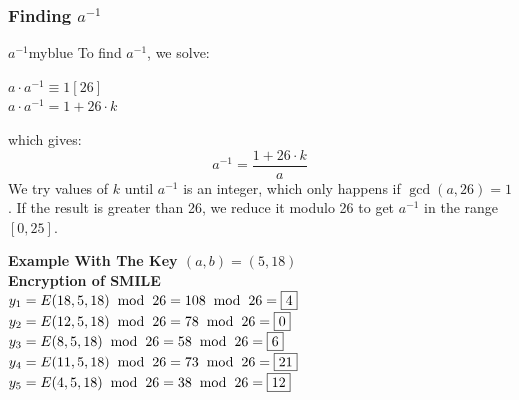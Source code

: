 \vspace{1cm}

\subsubsection{Finding \(a^{-1}\)}
\begin{prettyBox}{\(a^{-1}\)}{myblue}
To find \( a^{-1} \), we solve:


\begin{center}
    \(a\cdot a^{-1} \equiv 1 [26]\)\\[0.17cm]
    \(a \cdot a^{-1} = 1 + 26\cdot k\)
\end{center}

which gives:
\[
    \boxed{a^{-1} = \frac{1 + 26\cdot k}{a}}
\]
We try values of \(k\) until \( a^{-1} \) is an integer, which only happens if \( \gcd(a, 26) = 1 \).  
If the result is greater than 26, we reduce it modulo 26 to get \( a^{-1} \) in the range \( [0,25] \).
\end{prettyBox}

\newpage
\textbf{Example With The Key \((a,b) = (5,18)\)}\\[0.15cm]
\textbf{Encryption of SMILE}\\[0.15cm]

\(y_1 = E(18,5,18) \hspace{0.2cm} \text{mod} \hspace{0.2cm} 26 = 108 \hspace{0.2cm} \text{mod} \hspace{0.2cm} 26 = \boxed{4}\)\\[0.15cm]
\(y_2 = E(12,5,18) \hspace{0.2cm} \text{mod} \hspace{0.2cm} 26 = 78 \hspace{0.2cm} \text{mod} \hspace{0.2cm} 26 = \boxed{0}\)\\[0.15cm]
\(y_3 = E(8,5,18) \hspace{0.2cm} \text{mod} \hspace{0.2cm} 26 = 58 \hspace{0.2cm} \text{mod} \hspace{0.2cm} 26 = \boxed{6}\)\\[0.15cm]
\(y_4 = E(11,5,18) \hspace{0.2cm} \text{mod} \hspace{0.2cm} 26 = 73 \hspace{0.2cm} \text{mod} \hspace{0.2cm} 26 = \boxed{21}\)\\[0.15cm]
\(y_5 = E(4,5,18) \hspace{0.2cm} \text{mod} \hspace{0.2cm} 26 = 38 \hspace{0.2cm} \text{mod} \hspace{0.2cm} 26 = \boxed{12}\)\\[0.15cm]


